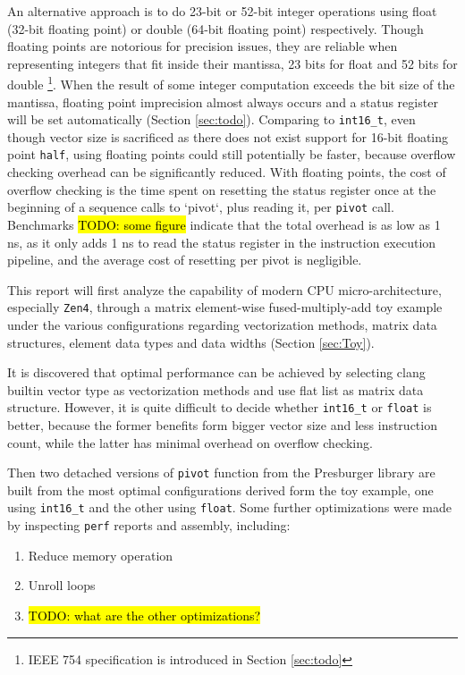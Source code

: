 \documentclass[logo,bsc,singlespacing,parskip]{infthesis}
\newenvironment{compactlist}
{ \begin{enumerate}
    \setlength{\itemsep}{0pt}
    \setlength{\parskip}{0pt}
    \setlength{\parsep}{0pt}     
}
{ \end{enumerate} }
\begin{document}
An alternative approach is to do 23-bit or 52-bit integer operations using float
(32-bit floating point) or double (64-bit floating point) respectively. Though
floating points are notorious for precision issues, they are reliable when
representing integers that fit inside their mantissa, 23 bits for float and 52
bits for double \footnote{ IEEE 754 specification is introduced in Section
\ref{sec:todo}}. When the result of some integer computation exceeds the bit
size of the mantissa, floating point imprecision almost always occurs and a
status register will be set automatically (Section \ref{sec:todo}). Comparing to
\texttt{int16\_t}, even though vector size is sacrificed as there does not exist
support for 16-bit floating point \texttt{half}, using floating points could
still potentially be faster, because overflow checking overhead can be
significantly reduced. With floating points, the cost of overflow checking is
the time spent on resetting the status register once at the beginning of a
sequence calls to `pivot`, plus reading it, per \texttt{pivot} call. Benchmarks
\hl{TODO: some figure} indicate that the total overhead is as low as 1 ns, as it
only adds 1 ns to read the status register in the instruction execution
pipeline, and the average cost of resetting per pivot is negligible. 

This report will first analyze the capability of modern CPU micro-architecture,
especially \texttt{Zen4}, through a matrix element-wise fused-multiply-add toy
example under the various configurations regarding vectorization methods, matrix
data structures, element data types and data widths (Section \ref{sec:Toy}). 

It is discovered that optimal performance can be achieved by selecting clang
builtin vector type as vectorization methods and use flat list as matrix data
structure. However, it is quite difficult to decide whether \texttt{int16\_t} or
\texttt{float} is better, because the former benefits form bigger vector size
and less instruction count, while the latter has minimal overhead on overflow
checking. 

Then two detached versions of \texttt{pivot} function from the Presburger
library are built from the most optimal configurations derived form the toy
example, one using \texttt{int16\_t} and the other using \texttt{float}. Some
further optimizations were made by inspecting \texttt{perf} reports and
assembly, including: 

\begin{compactlist} 
    \item Reduce memory operation
    \item Unroll loops
    \item\hl{TODO: what are the other optimizations?}
\end{compactlist}
\end{document}
